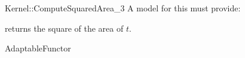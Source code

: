 \begin{ccRefFunctionObjectConcept}{Kernel::ComputeSquaredArea_3}
A model for this must provide:


       {returns the square of the area of $t$. }

\ccRefines
AdaptableFunctor

\ccSeeAlso
{}\\

\end{ccRefFunctionObjectConcept}

